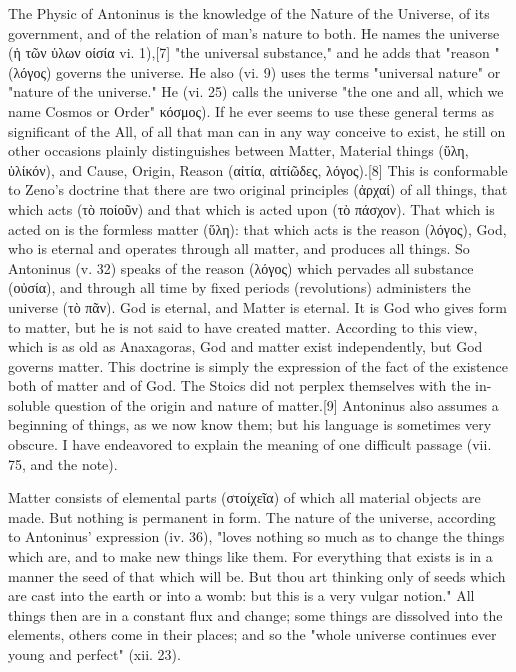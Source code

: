 The Physic of Antoninus is the knowledge of the Nature of the Universe, of its government, and of the relation of man's nature to both. He names the universe (\textgreek{ἡ τῶν ὑλων οίσία} vi. 1),[7] "the universal substance," and he adds that "reason " (\textgreek{λόγος}) governs the universe. He also (vi. 9) uses the terms "universal nature" or "nature of the universe." He (vi. 25) calls the universe "the one and all, which we name Cosmos or Order" \textgreek{κόσμος}). If he ever seems to use these general terms as significant of the All, of all that man can in any way conceive to exist, he still on other occasions plainly distinguishes between Matter, Material things (\textgreek{ὕλη, ὑλίκόν}), and Cause, Origin, Reason (\textgreek{αἰτία, αἰτίῶδες, λόγος}).[8] This is conformable to Zeno's doctrine that there are two original principles (\textgreek{ἀρχαί}) of all things, that which acts (\textgreek{τὸ ποίοῦν}) and that which is acted upon (\textgreek{τὸ πάσχον}). That which is acted on is the formless matter (\textgreek{ὕλη}): that which acts is the reason (\textgreek{λόγος}), God, who is eternal and operates through all matter, and produces all things. So Antoninus (v. 32) speaks of the reason (\textgreek{λόγος}) which pervades all substance (\textgreek{οὐσία}), and through all time by fixed periods (revolutions) administers the universe (\textgreek{τὸ πᾶν}). God is eternal, and Matter is eternal. It is God who gives form to matter, but he is not said to have created matter. According to this view, which is as old as Anaxagoras, God and matter exist independently, but God governs matter. This doctrine is simply the expression of the fact of the existence both of matter and of God. The Stoics did not perplex themselves with the in-soluble question of the origin and nature of matter.[9] Antoninus also assumes a beginning of things, as we now know them; but his language is sometimes very obscure. I have endeavored to explain the meaning of one difficult passage (vii. 75, and the note).

Matter consists of elemental parts (\textgreek{στοίχεῖα}) of which all material objects are made. But nothing is permanent in form. The nature of the universe, according to Antoninus' expression (iv. 36), "loves nothing so much as to change the things which are, and to make new things like them. For everything that exists is in a manner the seed of that which will be. But thou art thinking only of seeds which are cast into the earth or into a womb: but this is a very vulgar notion." All things then are in a constant flux and change; some things are dissolved into the elements, others come in their places; and so the "whole universe continues ever young and perfect" (xii. 23).

